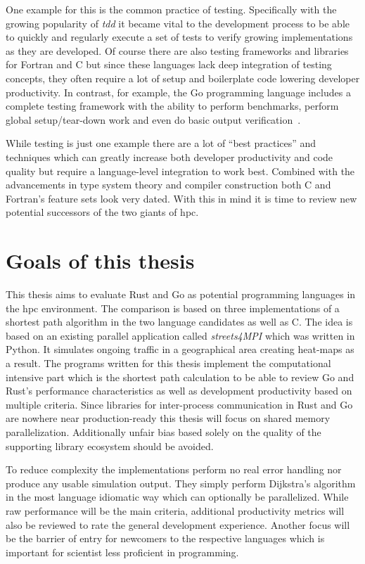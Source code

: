 One example for this is the common practice of testing. Specifically with the growing popularity of \textit{\gls{tdd}} it became vital to the development process to be able to quickly and regularly execute a set of tests to verify growing implementations as they are developed. Of course there are also testing frameworks and libraries for Fortran and C but since these languages lack deep integration of testing concepts, they often require a lot of setup and boilerplate code lowering developer productivity. In contrast, for example, the Go programming language includes a complete testing framework with the ability to perform benchmarks, perform global setup/tear-down work and even do basic output verification~\cite{go_doc_testing}.

While testing is just one example there are a lot of ``best practices'' and techniques which can greatly increase both developer productivity and code quality but require a language-level integration to work best. Combined with the advancements in type system theory and compiler construction both C and Fortran's feature sets look very dated. With this in mind it is time to review new potential successors of the two giants of \gls{hpc}.

\section{Goals of this thesis}
\label{sec:Introduction::Goals}

This thesis aims to evaluate Rust and Go as potential programming languages in the \gls{hpc} environment. The comparison is based on three implementations of a shortest path algorithm in the two language candidates as well as C. The idea is based on an existing parallel application called \textit{streets4MPI} which was written in Python. It simulates ongoing traffic in a geographical area creating heat-maps as a result. The programs written for this thesis implement the computational intensive part which is the shortest path calculation to be able to review Go and Rust's performance characteristics as well as development productivity based on multiple criteria. Since libraries for inter-process communication in Rust and Go are nowhere near production-ready this thesis will focus on shared memory parallelization. Additionally unfair bias based solely on the quality of the supporting library ecosystem should be avoided.

To reduce complexity the implementations perform no real error handling nor produce any usable simulation output. They simply perform Dijkstra's algorithm in the most language idiomatic way which can optionally be parallelized. While raw performance will be the main criteria, additional productivity metrics will also be reviewed to rate the general development experience. Another focus will be the barrier of entry for newcomers to the respective languages which is important for scientist less proficient in programming.

